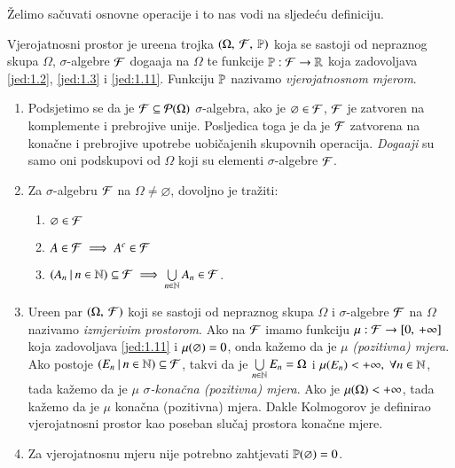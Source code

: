 \v Zelimo sa\v cuvati osnovne operacije i to nas vodi na sljede\' cu definiciju.

\begin{defn}
    Vjerojatnosni prostor je ure\dj ena trojka $(\Omega, \: \mathcal{F}, \: \mathbb{P})$ koja se sastoji od nepraznog skupa $\Omega$, $\sigma$-algebre $\mathcal{F}$ doga\dj aja na $\Omega$ te funkcije $\mathbb{P}: \mathcal{F} \to \mathbb{R}$ koja zadovoljava \eqref{jed:1.2}, \eqref{jed:1.3} i \eqref{jed:1.11}.
    Funkciju $\mathbb{P}$ nazivamo \emph{vjerojatnosnom mjerom}.
\end{defn}

\begin{nap} \label{nap:1.24}
    \begin{enumerate}[label=(\alph*)]
        \item Podsjetimo se da je $\mathcal{F} \subseteq \mathcal{P}({\Omega})$ $\sigma$-algebra, ako je $\varnothing \in \mathcal{F}$, $\mathcal{F}$ je zatvoren na komplemente i prebrojive unije. Posljedica toga je da je $\mathcal{F}$ zatvorena na kona\v cne i prebrojive upotrebe uobi\v cajenih skupovnih operacija.
        \emph{Doga\dj aji}  su samo oni podskupovi od $\Omega$ koji su elementi $\sigma$-algebre $\mathcal{F}$.
        \item Za $\sigma$-algebru $\mathcal{F}$ na $\Omega \neq  \varnothing$, dovoljno je tra\v ziti:
        \begin{enumerate}[label=(\roman*)]
            \item $\varnothing \in \mathcal{F}$
            \item $A \in \mathcal{F} \implies A^c \in \mathcal{F}$
            \item $({A_n} \: | \: {n \in \mathbb{N}}) \subseteq \mathcal{F} \implies \bigcup\limits_{n \in \mathbb{N}}^{} A_n \in \mathcal{F}$.
        \end{enumerate}
        \item Ure\dj en par $(\Omega, \: \mathcal{F})$ koji se sastoji od nepraznog skupa $\Omega$ i $\sigma$-algebre $\mathcal{F}$ na $\Omega$ nazivamo \emph{izmjerivim prostorom}.
        Ako na $\mathcal{F}$ imamo funkciju $\mu : \mathcal{F} \to [{0}, \:{+ \infty}]$ koja zadovoljava \eqref{jed:1.11} i $\mu({\varnothing}) = 0$, onda ka\v zemo da je $\mu$ \emph{(pozitivna) mjera}.
        Ako postoje $({E_n} \: | \: {n \in \mathbb{N}}) \subseteq \mathcal{F}$, takvi da je $\bigcup\limits_{n \in \mathbb{N}}^{} E_n = \Omega$ i $\mu({E_n}) < +\infty, \; \forall n \in \mathbb{N}$, tada ka\v zemo da je $\mu$ \emph{$\sigma$-kona\v cna (pozitivna) mjera}.
        Ako je $\mu({\Omega}) < +\infty$, tada ka\v zemo da je $\mu$ kona\v cna (pozitivna) mjera.
        Dakle Kolmogorov je definirao vjerojatnosni prostor kao poseban slu\v caj prostora kona\v cne mjere.
        \item Za vjerojatnosnu mjeru nije potrebno zahtjevati $\mathbb{P}({\varnothing}) = 0$.

\end{enumerate}
\end{nap}
